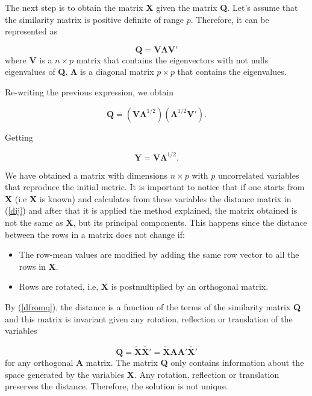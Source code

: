 \documentclass[11pt]{report}
\begin{document}
\indent The next step is to obtain the matrix \textbf{X} given the matrix 
\textbf{Q}. Let's assume that the similarity matrix is positive definite of 
range $p$. Therefore, it can be represented as

\[
\mathbf{Q} = \mathbf{V}\mathbf{\Lambda}\mathbf{V'}
\]
where $\mathbf{V}$ is a $n \times p$ matrix that contains the eigenvectors with
not nulls eigenvalues of \textbf{Q}. $\mathbf{\Lambda}$ is a diagonal matrix 
$p \times p$ that contains the eigenvalues.

\indent Re-writing the previous expression, we obtain

\begin{equation} \label{generalQ}
\mathbf{Q} = (\mathbf{V}\mathbf{\Lambda}^{1/2})(\mathbf{\Lambda}^{1/2}\mathbf{V'}).
\end{equation}

Getting

\[
\mathbf{Y} = \mathbf{V}\mathbf{\Lambda}^{1/2}.
\]

We have obtained a matrix with dimensions $n \times p$ with $p$ uncorrelated
variables that reproduce the initial metric. It is important to notice that if 
one starts from \textbf{X} (i.e \textbf{X} is known) and calculates from these
variables the distance matrix in (\ref{dij}) and after that it is applied
the method explained, the matrix obtained is not the same as \textbf{X}, but
its principal components. This happens since the distance between the rows in
a matrix does not change if:

\begin{itemize}
\item The row-mean values are modified by adding the same row vector to all
the rows in \textbf{X}.
\item Rows are rotated, i.e, \textbf{X} is postmultiplied by an orthogonal 
matrix.
\end{itemize}

\indent By (\ref{dfromq}), the distance is a function of the terms of the 
similarity matrix \textbf{Q} and this matrix is invariant given any rotation,
reflection or translation of the variables

\[
\mathbf{Q} = \mathbf{\widetilde{X}} \mathbf{\widetilde{X'}} = \mathbf{\widetilde{X}} \mathbf{A} \mathbf{A'}\mathbf{\widetilde{X'}}
\]
for any orthogonal \textbf{A} matrix. The matrix \textbf{Q} only contains 
information about the space generated by the variables \textbf{X}. Any rotation,
reflection or translation preserves the distance. Therefore, the solution
is not unique.
\end{document}
